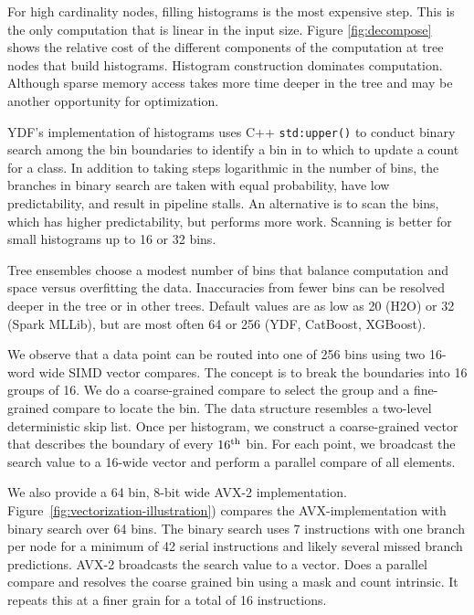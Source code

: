 \documentclass[sigconf,anonymous,review]{acmart}
\begin{document}
For high cardinality nodes, filling histograms is the most expensive step. This is the only computation that is linear in the input size. Figure \ref{fig:decompose} shows the relative cost of the different components of the computation at tree nodes that build histograms. Histogram construction dominates computation. Although sparse memory access takes more time deeper in the tree and may be another opportunity for optimization.

YDF's implementation of histograms uses C++ {\tt std:upper()} to conduct binary search among the bin boundaries to identify a bin in to which to update a count for a class. In addition to taking steps logarithmic in the number of bins, the branches in binary search are taken with equal probability, have low predictability, and result in pipeline stalls. An alternative is to scan the bins, which has higher predictability, but performs more work. Scanning is better for small histograms up to 16 or 32 bins.

Tree ensembles choose a modest number of bins that balance computation and space versus overfitting the data. Inaccuracies from fewer bins can be resolved deeper in the tree or in other trees. Default values are as low as 20 (H2O) or 32 (Spark MLLib), but are most often 64 or 256 (YDF, CatBoost, XGBoost).


We observe that a data point can be routed into one of 256 bins using two 16-word wide SIMD vector compares. The concept is to break the boundaries into 16 groups of 16. We do a coarse-grained compare to select the group and a fine-grained compare to locate the bin. The data structure resembles a two-level deterministic skip list. Once per histogram, we construct a coarse-grained vector that describes the boundary of every $16^{\rm th}$ bin. For each point, we broadcast the search value to a 16-wide vector and perform a parallel compare of all elements.

We also provide a 64 bin, 8-bit wide AVX-2 implementation. Figure~\ref{fig:vectorization-illustration}) compares the AVX-implementation with binary search over 64 bins. The binary search uses 7 instructions with one branch per node for a minimum of 42 serial instructions and likely several missed branch predictions. AVX-2 broadcasts the search value to a vector. Does a parallel compare and resolves the coarse grained bin using a mask and count intrinsic. It repeats this at a finer grain for a total of 16 instructions.
\end{document}
